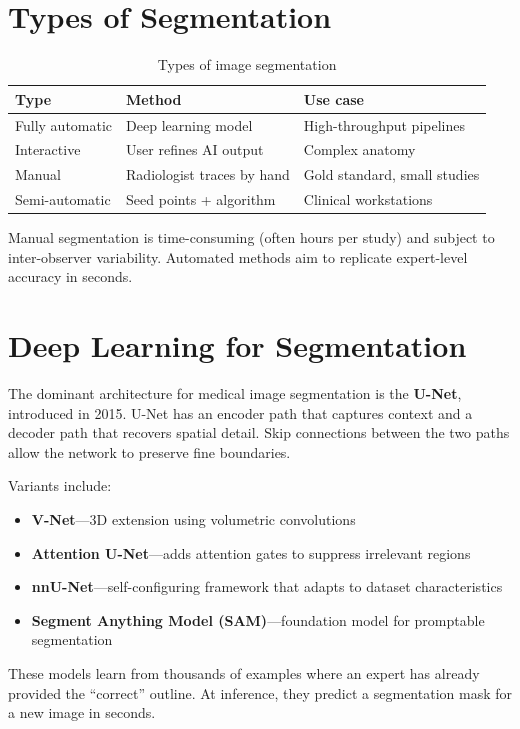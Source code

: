 \section{Types of Segmentation}
\begin{table}[h]
\centering
\caption{Types of image segmentation}
\begin{tabular}{|l|l|l|}
\hline
\textbf{Type} & \textbf{Method} & \textbf{Use case} \\
\hline
Fully automatic & Deep learning model & High-throughput pipelines \\
\hline
Interactive & User refines AI output & Complex anatomy \\
\hline
Manual & Radiologist traces by hand & Gold standard, small studies \\
\hline
Semi-automatic & Seed points + algorithm & Clinical workstations \\
\hline
\end{tabular}
\end{table}

Manual segmentation is time-consuming (often hours per study) and subject to inter-observer variability. Automated methods aim to replicate expert-level accuracy in seconds.

\section{Deep Learning for Segmentation}
The dominant architecture for medical image segmentation is the \textbf{U-Net}, introduced in 2015. U-Net has an encoder path that captures context and a decoder path that recovers spatial detail. Skip connections between the two paths allow the network to preserve fine boundaries.

Variants include:
\begin{itemize}
    \item \textbf{V-Net}---3D extension using volumetric convolutions
    \item \textbf{Attention U-Net}---adds attention gates to suppress irrelevant regions
    \item \textbf{nnU-Net}---self-configuring framework that adapts to dataset characteristics
    \item \textbf{Segment Anything Model (SAM)}---foundation model for promptable segmentation
\end{itemize}

These models learn from thousands of examples where an expert has already provided the ``correct'' outline. At inference, they predict a segmentation mask for a new image in seconds.

